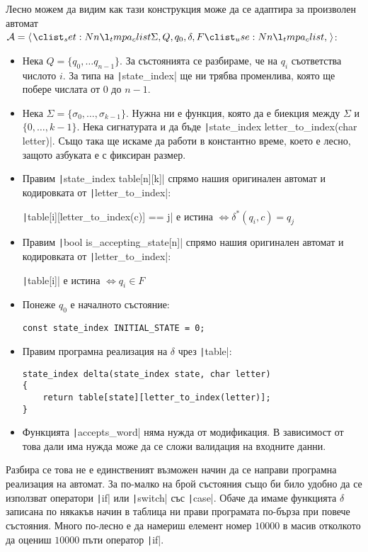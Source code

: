 Лесно можем да видим как тази конструкция може да се адаптира за произволен автомат $\mathcal{A} = \opair{\Sigma, Q, q_0, \delta, F}$:
\begin{itemize}
    \item Нека $Q = \{ q_0, \dots q_{n - 1} \}$.
          За състоянията се разбираме, че на $q_i$ съответства числото $i$.
          За типа на \texttt|state_index| ще ни трябва променлива, която ще побере числата от $0$ до $n - 1$.
    \item Нека $\Sigma = \{ \sigma_0, \dots, \sigma_{k - 1} \}$.
          Нужна ни е функция, която да е биекция между $\Sigma$ и $\{ 0, \dots, k - 1 \}$.
          Нека сигнатурата и да бъде \texttt|state_index letter_to_index(char letter)|.
          Също така ще искаме да работи в константно време, което е лесно, защото азбуката е с фиксиран размер.
    \item Правим \texttt|state_index table[n][k]| спрямо нашия оригинален автомат и кодировката от \texttt|letter_to_index|:
          \begin{center}
              \texttt|table[i][letter_to_index(c)] == j| е истина $\iff \delta^*(q_i, c) = q_j$
          \end{center}
    \item Правим \texttt|bool is_accepting_state[n]| спрямо нашия оригинален автомат и кодировката от \texttt|letter_to_index|:
          \begin{center}
              \texttt|table[i]| е истина $\iff q_i \in F$
          \end{center}
    \item Понеже $q_0$ е началното състояние:
          \begin{verbatim}
const state_index INITIAL_STATE = 0;
          \end{verbatim}
    \item Правим програмна реализация на $\delta$ чрез \texttt|table|:
          \begin{verbatim}
state_index delta(state_index state, char letter)
{
    return table[state][letter_to_index(letter)];
}
          \end{verbatim}
    \item Функцията \texttt|accepts_word| няма нужда от модификация.
          В зависимост от това дали има нужда може да се сложи валидация на входните данни.
\end{itemize}

\begin{remark}
    Разбира се това не е единственият възможен начин да се направи програмна реализация на автомат.
    За по-малко на брой състояния също би било удобно да се използват оператори \texttt|if| или \texttt|switch| със \texttt|case|.
    Обаче да имаме функцията $\delta$ записана по някакъв начин в таблица ни прави програмата по-бърза при повече състояния.
    Много по-лесно е да намериш елемент номер $10000$ в масив отколкото да оцениш $10000$ пъти оператор \texttt|if|.
\end{remark}

